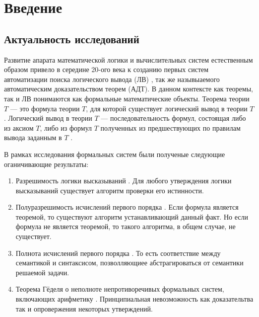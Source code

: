 \chapter*{Введение}

\section*{Актуальность исследований}
Развитие апарата математической логики и вычислительных систем естественным образом привело в середине 20-ого века к созданию первых систем автоматизации поиска логического вывода (ЛВ) \cite{Newell1, Newell2, WangHao}, так же назывыаемого автоматическим доказательством теорем (АДТ). В данном контексте как теоремы, так и ЛВ понимаются как формальные математические объекты. Теорема теории $T$ --- это формула теории $T$, для которой существует логический вывод в теории $T$ \cite{mendelson}. Логический вывод в теории $T$ --- последовательность формул, состоящая либо из аксиом $T$, либо из формул $T$ полученных из предшествующих по правилам вывода заданным в $T$ \cite{mendelson}.

В рамках исследования формальных систем были полученые следующие оганичивающие результаты:
\begin{enumerate}
\item Разрешимость логики высказываний \cite{mendelson}. Для любого утверждения логики высказываний существует алгоритм проверки его истинности.
\item Полуразрешимость исчислений первого порядка \cite{turing}. Если формула является теоремой, то существуют алгоритм устанавливающий данный факт. Но если формула не является теоремой, то такого алгоритма, в общем случае, не существует.
\item Полнота исчислений первого порядка \cite{Godel1}. То есть соответствие между семантикой и синтаксисом, позволляющиее абстрагироваться от семантики решаемой задачи. 
\item Теорема Гёделя о неполноте непротиворечивых формальных систем, включающих арифметику \cite{Godel2}. Принципиальная невозможность как доказательтва так и опровержения некоторых утверждений.
\end{enumerate}

